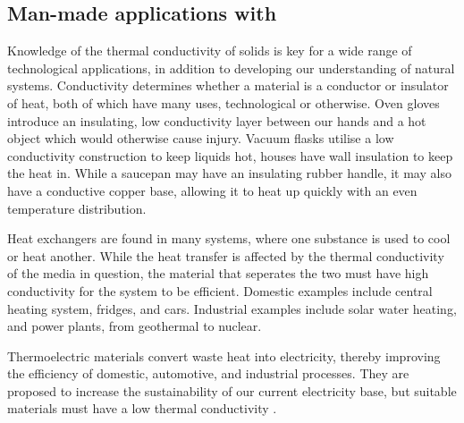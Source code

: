 \subsection{Man-made applications with \tc}
Knowledge of the thermal conductivity of solids is key for a wide range of technological applications, in addition to developing our understanding of natural systems. Conductivity determines whether a material is a conductor or insulator of heat, both of which have many uses, technological or otherwise. Oven gloves introduce an insulating, low conductivity layer between our hands and a hot object which would otherwise cause injury. Vacuum flasks utilise a low conductivity construction to keep liquids hot, houses have wall insulation to keep the heat in. While a saucepan may have an insulating rubber handle, it may also have a conductive copper base, allowing it to heat up quickly with an even temperature distribution.

Heat exchangers are found in many systems, where one substance is used to cool or heat another. While the heat transfer is affected by the thermal conductivity of the media in question, the material that seperates the two must have high conductivity for the system to be efficient. Domestic examples include central heating system, fridges, and cars. Industrial examples include solar water heating, and power plants, from geothermal to nuclear.

Thermoelectric materials convert waste heat into electricity, thereby improving the efficiency of domestic, automotive, and industrial processes. They are proposed to increase the sustainability of our current electricity base, but suitable materials must have a low thermal conductivity \citep{Snyder2008}.






































